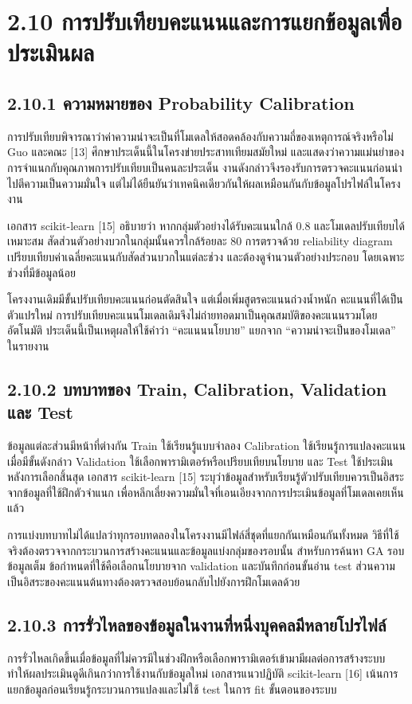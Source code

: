 \section*{2.10 การปรับเทียบคะแนนและการแยกข้อมูลเพื่อประเมินผล}
\subsection*{2.10.1 ความหมายของ Probability Calibration}
การปรับเทียบพิจารณาว่าค่าความน่าจะเป็นที่โมเดลให้สอดคล้องกับความถี่ของเหตุการณ์จริงหรือไม่ Guo และคณะ [13] ศึกษาประเด็นนี้ในโครงข่ายประสาทเทียมสมัยใหม่ และแสดงว่าความแม่นยำของการจำแนกกับคุณภาพการปรับเทียบเป็นคนละประเด็น งานดังกล่าวจึงรองรับการตรวจคะแนนก่อนนำไปตีความเป็นความมั่นใจ แต่ไม่ได้ยืนยันว่าเทคนิคเดียวกันให้ผลเหมือนกันกับข้อมูลโปรไฟล์ในโครงงาน

เอกสาร scikit-learn [15] อธิบายว่า หากกลุ่มตัวอย่างได้รับคะแนนใกล้ 0.8 และโมเดลปรับเทียบได้เหมาะสม สัดส่วนตัวอย่างบวกในกลุ่มนั้นควรใกล้ร้อยละ 80 การตรวจด้วย reliability diagram เปรียบเทียบค่าเฉลี่ยคะแนนกับสัดส่วนบวกในแต่ละช่วง และต้องดูจำนวนตัวอย่างประกอบ โดยเฉพาะช่วงที่มีข้อมูลน้อย

โครงงานเดิมมีขั้นปรับเทียบคะแนนก่อนตัดสินใจ แต่เมื่อเพิ่มสูตรคะแนนถ่วงน้ำหนัก คะแนนที่ได้เป็นตัวแปรใหม่ การปรับเทียบคะแนนโมเดลเดิมจึงไม่ถ่ายทอดมาเป็นคุณสมบัติของคะแนนรวมโดยอัตโนมัติ ประเด็นนี้เป็นเหตุผลให้ใช้คำว่า ``คะแนนนโยบาย'' แยกจาก ``ความน่าจะเป็นของโมเดล'' ในรายงาน

\subsection*{2.10.2 บทบาทของ Train, Calibration, Validation และ Test}
ข้อมูลแต่ละส่วนมีหน้าที่ต่างกัน Train ใช้เรียนรู้แบบจำลอง Calibration ใช้เรียนรู้การแปลงคะแนนเมื่อมีขั้นดังกล่าว Validation ใช้เลือกพารามิเตอร์หรือเปรียบเทียบนโยบาย และ Test ใช้ประเมินหลังการเลือกสิ้นสุด เอกสาร scikit-learn [15] ระบุว่าข้อมูลสำหรับเรียนรู้ตัวปรับเทียบควรเป็นอิสระจากข้อมูลที่ใช้ฝึกตัวจำแนก เพื่อหลีกเลี่ยงความมั่นใจที่เอนเอียงจากการประเมินข้อมูลที่โมเดลเคยเห็นแล้ว

การแบ่งบทบาทไม่ได้แปลว่าทุกรอบทดลองในโครงงานมีไฟล์สี่ชุดที่แยกกันเหมือนกันทั้งหมด วิธีที่ใช้จริงต้องตรวจจากกระบวนการสร้างคะแนนและข้อมูลแบ่งกลุ่มของรอบนั้น สำหรับการค้นหา GA รอบข้อมูลเต็ม ข้อกำหนดที่ใช้คือเลือกนโยบายจาก validation และบันทึกก่อนขั้นอ่าน test ส่วนความเป็นอิสระของคะแนนต้นทางต้องตรวจสอบย้อนกลับไปยังการฝึกโมเดลด้วย

\subsection*{2.10.3 การรั่วไหลของข้อมูลในงานที่หนึ่งบุคคลมีหลายโปรไฟล์}
การรั่วไหลเกิดขึ้นเมื่อข้อมูลที่ไม่ควรมีในช่วงฝึกหรือเลือกพารามิเตอร์เข้ามามีผลต่อการสร้างระบบ ทำให้ผลประเมินดูดีเกินกว่าการใช้งานกับข้อมูลใหม่ เอกสารแนวปฏิบัติ scikit-learn [16] เน้นการแยกข้อมูลก่อนเรียนรู้กระบวนการแปลงและไม่ใช้ test ในการ fit ขั้นตอนของระบบ

